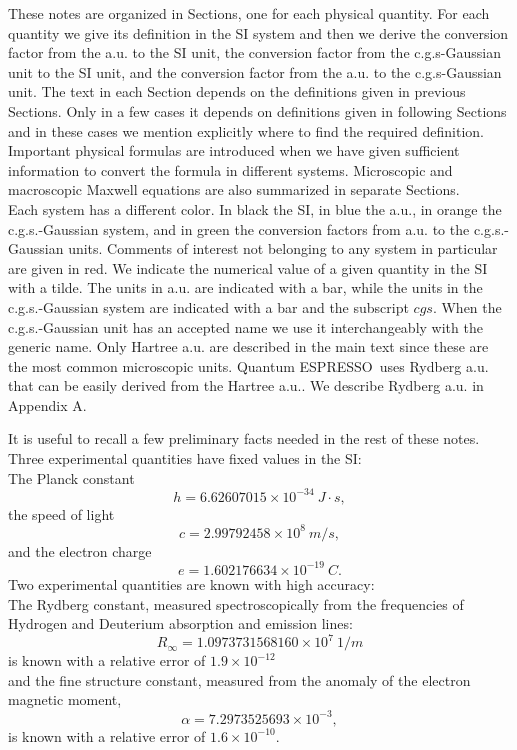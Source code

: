 \documentclass[12pt,a4paper]{article}
\def\qe{{\sc Quantum ESPRESSO}}
\def\hplanck{6.62607015\times 10^{-34}}
\def\cspeed{2.99792458\times 10^{8}}
\def\e{1.602176634\times 10^{-19}}
\def\rydberg{1.0973731568160\times 10^{7}}
\def\alphaf{7.2973525693\times 10^{-3}}
\begin{document}
These notes are organized in Sections, one for each physical quantity. 
For each quantity we give its definition in the SI system and then we derive 
the conversion factor from the a.u. to the SI unit, the conversion 
factor from the c.g.s-Gaussian unit to the SI unit, and the conversion 
factor from the a.u. to the c.g.s-Gaussian unit. The text in each Section 
depends on the definitions given in previous Sections. Only in a few cases 
it depends on definitions given in following Sections and in these cases 
we mention explicitly where to find the required definition. Important 
physical formulas are introduced when we have given sufficient information to
convert the formula in different systems. Microscopic and macroscopic 
Maxwell equations are also summarized in separate Sections. \\
Each system has a different color. In black the SI, in blue the a.u., in 
orange the c.g.s.-Gaussian system, 
and in green the conversion factors from a.u. to the c.g.s.-Gaussian units. 
Comments of interest not belonging to any system in particular are given 
in red. We indicate the numerical value of a given quantity in the SI 
with a tilde. The units in a.u. are indicated with a bar, while the units 
in the c.g.s.-Gaussian system are indicated with a bar and the subscript 
$cgs$. When the c.g.s.-Gaussian unit has an accepted name we use it 
interchangeably with the generic name. Only Hartree a.u. are described 
in the main text since these are the most common microscopic units. 
\qe\ uses Rydberg a.u. that can be easily derived from the Hartree
a.u.. We describe Rydberg a.u. in Appendix A.

It is useful to recall a few preliminary facts needed in the rest of 
these notes. \\
Three experimental quantities have fixed values in the SI: 
\\
The Planck constant 
\begin{equation}
h=\hplanck\ J\cdot s, 
\label{hplanck}
\end{equation}
the speed of light 
\begin{equation}
c=\cspeed\ m/s,
\label{cspeed}
\end{equation}
 and the electron charge
\begin{equation}
e=\e\ C. 
\label{echarge}
\end{equation}
Two experimental quantities are known with high accuracy:
\\
The Rydberg constant, measured spectroscopically from the frequencies of
Hydrogen and Deuterium absorption and emission lines:
\begin{equation}
R_\infty=
\rydberg\ 1/m
\label{rydberg}
\end{equation}
is known with a relative error of $1.9\times 10^{-12}$ \\
and the fine structure constant, measured from the anomaly of the
electron magnetic moment,
\begin{equation}
\alpha=
\alphaf,
\label{alpha}
\end{equation}
is known with a relative error of $1.6\times 10^{-10}$.
\end{document}
